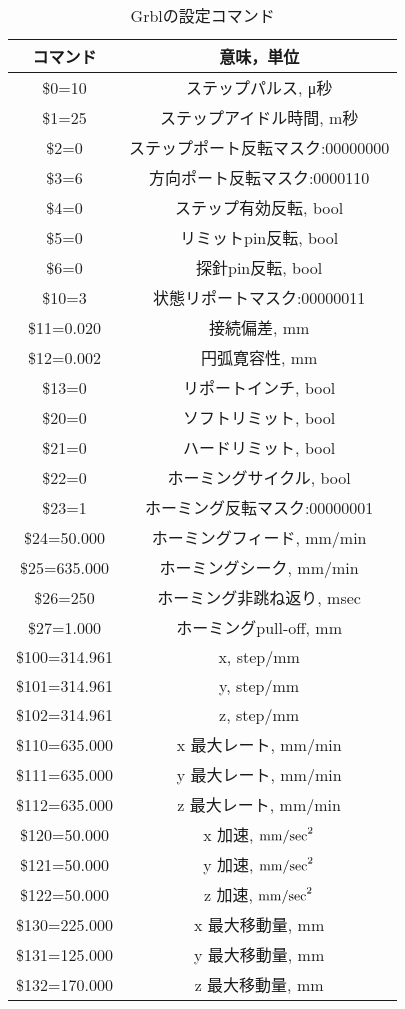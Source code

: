 \documentclass[dvipdfmx]{jsarticle}
\begin{document}
\begin{table}[H]
    \centering
    \caption{Grblの設定コマンド}
    \label{tab:Grbl-Setting}
    \begin{tabular}{|c|c|}
    \hline
    コマンド & 意味，単位 \\ \hline
    \$0=10 & ステップパルス, μ秒 \\ \hline
    \$1=25 & ステップアイドル時間, m秒 \\ \hline
    \$2=0 & ステップポート反転マスク:00000000 \\ \hline
    \$3=6 & 方向ポート反転マスク:0000110 \\ \hline
    \$4=0 & ステップ有効反転, bool \\ \hline
    \$5=0 & リミットpin反転, bool \\ \hline
    \$6=0 & 探針pin反転, bool \\ \hline
    \$10=3 & 状態リポートマスク:00000011 \\ \hline
    \$11=0.020 & 接続偏差, mm \\ \hline
    \$12=0.002 & 円弧寛容性, mm \\ \hline
    \$13=0 & リポートインチ, bool \\ \hline
    \$20=0 & ソフトリミット, bool \\ \hline
    \$21=0 & ハードリミット, bool \\ \hline
    \$22=0 & ホーミングサイクル, bool \\ \hline
    \$23=1 & ホーミング反転マスク:00000001 \\ \hline
    \$24=50.000 & ホーミングフィード, mm/min \\ \hline
    \$25=635.000 & ホーミングシーク, mm/min \\ \hline
    \$26=250 & ホーミング非跳ね返り, msec \\ \hline
    \$27=1.000 & ホーミングpull-off, mm \\ \hline
    \$100=314.961 & x, step/mm \\ \hline
    \$101=314.961 & y, step/mm \\ \hline
    \$102=314.961 & z, step/mm \\ \hline
    \$110=635.000 & x 最大レート, mm/min \\ \hline
    \$111=635.000 & y 最大レート, mm/min \\ \hline
    \$112=635.000 & z 最大レート, mm/min \\ \hline
    \$120=50.000 & x 加速, $\rm{mm/sec}^2$ \\ \hline
    \$121=50.000 & y 加速, $\rm{mm/sec}^2$ \\ \hline
    \$122=50.000 & z 加速, $\rm{mm/sec}^2$ \\ \hline
    \$130=225.000 & x 最大移動量, mm \\ \hline
    \$131=125.000 & y 最大移動量, mm \\ \hline
    \$132=170.000 & z 最大移動量, mm \\ \hline
    \end{tabular}
    \end{table}
\end{document}
